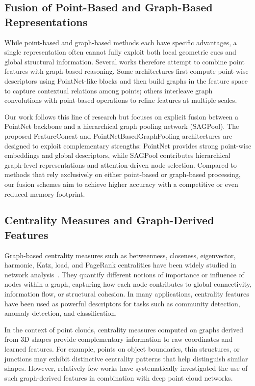 \documentclass[conference]{IEEEtran}
\begin{document}
\subsection{Fusion of Point-Based and Graph-Based Representations}

While point-based and graph-based methods each have specific advantages, a
single representation often cannot fully exploit both local geometric cues and
global structural information. Several works therefore attempt to combine point
features with graph-based reasoning. Some architectures first compute
point-wise descriptors using PointNet-like blocks and then build graphs in the
feature space to capture contextual relations among points; others interleave
graph convolutions with point-based operations to refine features at multiple
scales.

Our work follows this line of research but focuses on explicit fusion between a
PointNet backbone and a hierarchical graph pooling network (SAGPool). The
proposed FeatureConcat and PointNetBasedGraphPooling architectures are designed
to exploit complementary strengths: PointNet provides strong point-wise
embeddings and global descriptors, while SAGPool contributes hierarchical
graph-level representations and attention-driven node selection. Compared to
methods that rely exclusively on either point-based or graph-based processing,
our fusion schemes aim to achieve higher accuracy with a competitive or even
reduced memory footprint.

\subsection{Centrality Measures and Graph-Derived Features}

Graph-based centrality measures such as betweenness, closeness, eigenvector,
harmonic, Katz, load, and PageRank centralities have been widely studied in
network analysis~\cite{b4,b5}. They quantify different notions of importance
or influence of nodes within a graph, capturing how each node contributes to
global connectivity, information flow, or structural cohesion. In many
applications, centrality features have been used as powerful descriptors for
tasks such as community detection, anomaly detection, and classification.

In the context of point clouds, centrality measures computed on graphs derived
from 3D shapes provide complementary information to raw coordinates and learned
features. For example, points on object boundaries, thin structures, or
junctions may exhibit distinctive centrality patterns that help distinguish
similar shapes. However, relatively few works have systematically investigated
the use of such graph-derived features in combination with deep point cloud
networks.
\end{document}
